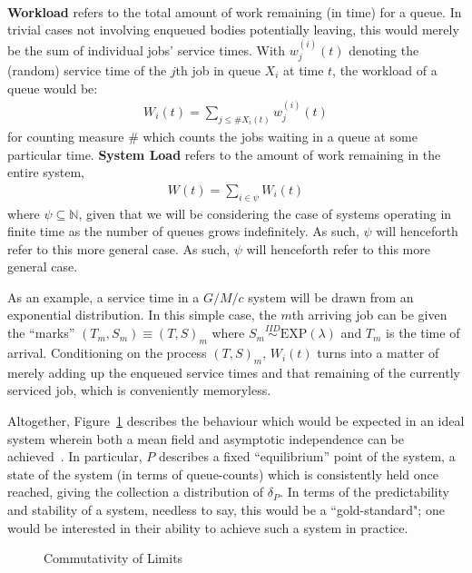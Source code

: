 \begin{definition}
    \hfill \\
    \textbf{Workload} refers to the total amount of work remaining (in time) for a queue.
    In trivial cases not involving enqueued bodies potentially leaving, this would merely be the sum of individual jobs' service times. With $w^{(i)}_{j} (t)$ denoting the (random) service time of the $j$th job in queue $X_{i}$ at time $t$, the workload of a queue would be:
    \begin{align}
        W_{i}(t) = \sum_{j \leq \#X_{i}(t)}w^{(i)}_{j}(t)
    \end{align}
    for counting measure $\#$ which counts the jobs waiting in a queue at some particular time. \textbf{System Load} refers to the amount of work remaining in the entire system,
    \begin{align*}
        W(t) = \sum_{i \in \psi}W_{i}(t)
    \end{align*}
    where $\psi \subseteq \mathbb{N}$, given that we will be considering the case of systems operating in finite time as the number of queues grows indefinitely.
    As such, $\psi$ will henceforth refer to this more general case.
    As such, $\psi$ will henceforth refer to this more general case.
\end{definition}
As an example, a service time in a $G/M/c$ system will be drawn from an exponential distribution. In this simple case,
the $m$th arriving job can be given the ``marks'' $(T_{m}, S_{m})\equiv (T, S)_{m}$ where
$S_{m} \overset{IID}\sim \text{EXP}(\lambda)$ and $T_{m}$ is the time of arrival. Conditioning on the process
$(T,S)_{m}$, $W_{i}(t)$ turns into a matter of merely adding up the enqueued service times and that remaining of the
currently serviced job, which is conveniently memoryless.

Altogether, Figure~\ref{fig:1} describes the behaviour which would be expected in an ideal system wherein both a mean field and asymptotic independence can be achieved~\cite{mukhopadhyay_analysis_nodate}. In particular, $P$ describes a fixed ``equilibrium'' point of the system,
a state of the system (in terms of queue-counts) which is consistently held once reached, giving the collection a distribution of $\delta_{P}$.
In terms of the predictability and stability of a system, needless to say, this would be a ``gold-standard";
one would be interested in their ability to achieve such a system in practice.

\begin{figure}
    \centering
    \caption{Commutativity of Limits}
    \label{fig:1}
\end{figure}

